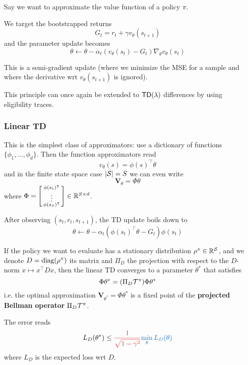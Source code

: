 \documentclass[../course-notes.tex]{subfiles}
\begin{document}
Say we want to approximate the value function of a policy $\pi$.

We target the bootstrapped returns
\[
	G_t = r_t + \gamma v_{\theta}(s_{t+1})
\]
and the parameter update becomes
\begin{equation}
	\theta \leftarrow \theta - \alpha_t (v_{\theta}(s_t)-G_t) \nabla_\theta v_\theta(s_t)
\end{equation}

This is a semi-gradient update (where we minimize the MSE for a sample and where the derivative wrt $v_\theta(s_{t+1})$ is ignored).

This principle can once again be extended to $\mathsf{TD}(\lambda)$ differences by using eligibility traces.

\subsubsection{Linear TD}

This is the simplest class of approximators: use a dictionary of functions $\{\phi_1, \ldots, \phi_d\}$. Then the function approximators read
\[
	v_\theta(s) = \phi(s)^\intercal \theta
\]
and in the finite state space case $|\mathcal{S}| = S$ we can even write
\[
	\mathbf{V}_\theta = \Phi\theta
\]
where $\Phi = \begin{bsmallmatrix}\phi(s_1)^\intercal \\ \vdots \\ \phi(s_S)^\intercal \end{bsmallmatrix} \in\mathbb{R}^{S\times d}$.

After observing $(s_t,r_t,s_{t+1})$, the TD update boils down to
\begin{equation}\label{eq:LinearTDupdate}
	\theta \leftarrow \theta - \alpha_t (\phi(s_t)^\intercal \theta - G_t)\phi(s_t)
\end{equation}


\begin{prop}
If the policy we want to evaluate has a stationary distribution $\rho^\pi \in \mathbb{R}^{\mathcal{S}}$, and we denote $D = \operatorname{\mathrm{diag}}(\rho^\pi)$ its matrix and $\Pi_D$ the projection with respect to the $D$-norm $x\mapsto x^\intercal D x$, then the linear TD converges to a parameter $\theta^*$ that satisfies
\begin{equation}
	\Phi\theta^* =
	(\Pi_D \mathcal{T}^\pi) \Phi\theta^*
\end{equation}
i.e. the optimal approximation $\mathbf{V}_{\theta^*} = \Phi\theta^*$ is a fixed point of the \textbf{\bluefont projected Bellman operator} $\Pi_D\mathcal{T}^\pi$.

The error reads
\begin{equation}
		L_D(\theta^*) \leq {\redfont \frac{1}{\sqrt{1-\gamma^2}}} {\bluefont \min_\theta L_D(\theta)}
\end{equation}
where $L_D$ is the expected loss wrt $D$.
\end{prop}
\end{document}
